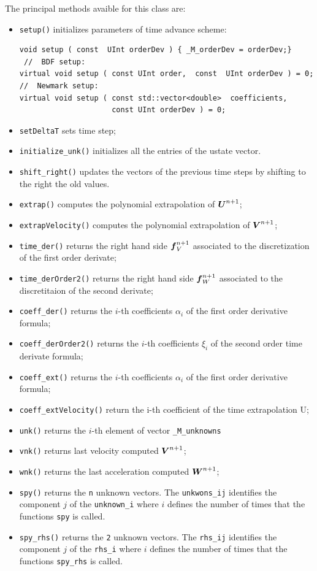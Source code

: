 \documentclass[english,a4paper]{article}
\newcommand{\Ubf}{\text{\mbox{\boldmath $U$}}}
\newcommand{\Abf}{\text{\mbox{\boldmath $W$}}}
\newcommand{\fbf}{\text{\mbox{\boldmath $f$}}}
\newcommand{\Wbf}{\text{\mbox{\boldmath $V$}}}
\begin{document}
  The principal methods  avaible for this class are:
  \begin{itemize}
  \item \verb"setup()" initializes
    parameters of time advance
    scheme:
\begin{verbatim}
void setup ( const  UInt orderDev ) { _M_orderDev = orderDev;}
 //  BDF setup:
virtual void setup ( const UInt order,  const  UInt orderDev ) = 0;
//  Newmark setup:
virtual void setup ( const std::vector<double>  coefficients,
                     const UInt orderDev ) = 0;
\end{verbatim}
\item \verb"setDeltaT" sets time step;
  \item \verb"initialize_unk()" initializes all the entries of the
    ustate vector.
  \item \verb"shift_right()" updates the vectors of the previous time
    steps by shifting to the right  the old values.
  \item \verb"extrap()"  computes the polynomial extrapolation of  $\Ubf^{n+1}$;
  \item \verb"extrapVelocity()"  computes the polynomial extrapolation of $\Wbf^{n+1}$;
  \item \verb"time_der()" returns the right hand side $\fbf_V^{n+1}$
    associated to the discretization of the  first order derivate;
  \item \verb"time_derOrder2()" returns the right hand side $\fbf_W^{n+1}$ associated to the discretitaion of  the second derivate;
  \item \verb"coeff_der()" returns the $i$-th coefficients $\alpha_i$
    of the first order derivative
    formula;
 \item \verb"coeff_derOrder2()" returns the $i$-th coefficients $\xi_i$ of
    the second order time derivate formula;
  \item \verb"coeff_ext()" returns the $i$-th coefficients $\alpha_i$ of the first order derivative formula;
 \item \verb"coeff_extVelocity()"
   return the i-th coefficient of
   the time extrapolation U;

 \item \verb"unk()" returns the
   $i$-th element of vector
   \verb"_M_unknowns"

 \item \verb"vnk()" returns last
   velocity computed  $\Wbf^{n+1}$;

 \item \verb"wnk()" returns the last
   acceleration computed
   $\Abf^{n+1}$;
\item \verb"spy()" returns the
\verb"n"  unknown vectors. The
\verb"unkwons_ij"
 identifies the component $j$ of the
 \verb"unknown_i" where $i$ defines
 the number of times that the
 functions \verb"spy" is called.
\item \verb"spy_rhs()" returns the
\verb"2"  unknown vectors. The
\verb"rhs_ij"  identifies the component $j$ of the
 \verb"rhs_i" where $i$ defines
 the number of times that the
 functions \verb"spy_rhs" is called.
 \end{itemize}
\end{document}
